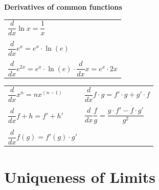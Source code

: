 \documentclass{article}
\begin{document}
\begin{center}
\pagebreak

\text{}

\vspace{0.7cm}


\textbf{Derivatives of common functions}


\begin{minipage}{0.4\textwidth}
  \begin{tabular}{l}
$\dfrac{d}{dx} \ln x = \dfrac{1}{x}$\\
\\
$\dfrac{d}{dx} e^x = e^x \cdot \ln(e)$\\
\\
$\dfrac{d}{dx} e^{2x} = e^x \cdot \ln(e) \cdot \dfrac{d}{dx} x = e^x \cdot 2x$
\end{tabular}
\end{minipage}
\begin{minipage}{0.5\textwidth}
\begin{tabular}{ll}
$\dfrac{d}{dx} x^n = nx^{(n-1)}$ & $\dfrac{d}{dx} f \cdot g = f'\cdot g + g' \cdot f$\\
\\
$\dfrac{d}{dx} f + h = f' + h'$ & $\dfrac{d}{dx} \dfrac{f}{g} = \dfrac{g\cdot f' - f \cdot g'}{g^2}$\\
\\
$\dfrac{d}{dx} f(g) = f'(g) \cdot g'$
\end{tabular}
\end{minipage}


\end{center}



\section{Uniqueness of Limits}
\end{document}
